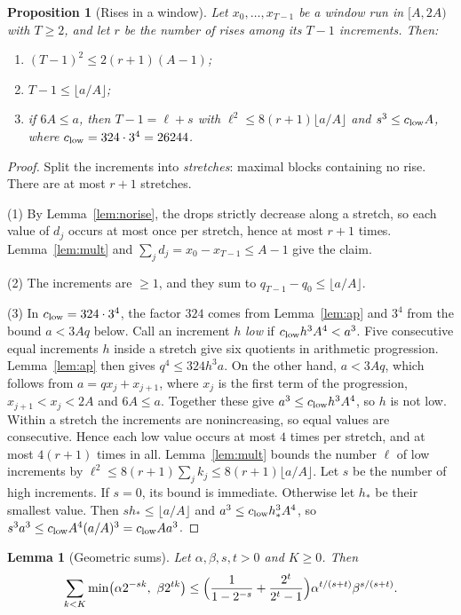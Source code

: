 \documentclass[11pt]{article}
\newtheorem{lemma}[theorem]{Lemma}
\newtheorem{proposition}[theorem]{Proposition}
\theoremstyle{definition}
\theoremstyle{remark}
\begin{document}
\begin{proposition}[Rises in a window]\label{prop:rises}
Let $x_0,\dots,x_{T-1}$ be a window run in $[A,2A)$ with $T\ge2$, and let $r$ be the number
of rises among its $T-1$ increments. Then:
\begin{enumerate}
\item $(T-1)^2\le 2(r+1)(A-1)$;
\item $T-1\le\lfloor a/A\rfloor$;
\item if $6A\le a$, then $T-1=\ell+s$ with $\ell^2\le 8(r+1)\lfloor a/A\rfloor$ and
$s^3\le c_{\rm low}A$, where $c_{\rm low}=324\cdot3^4=26244$.
\end{enumerate}
\end{proposition}

\begin{proof}
Split the increments into \emph{stretches}: maximal blocks containing no rise. There are at most
$r+1$ stretches.

(1) By Lemma~\ref{lem:norise}, the drops strictly decrease along a stretch, so each value of $d_j$
occurs at most once per stretch, hence at most $r+1$ times. Lemma~\ref{lem:mult} and
$\sum_jd_j=x_0-x_{T-1}\le A-1$ give the claim.

(2) The increments are $\ge1$, and they sum to $q_{T-1}-q_0\le\lfloor a/A\rfloor$.

(3) In $c_{\rm low}=324\cdot3^4$, the factor $324$ comes from Lemma~\ref{lem:ap}
and $3^4$ from the bound $a<3Aq$ below. Call an increment $h$ \emph{low} if
$c_{\rm low}h^3A^4<a^3$. Five consecutive equal increments
$h$ inside a stretch give six quotients in arithmetic progression. Lemma~\ref{lem:ap} then
gives $q^4\le324h^3a$. On the other hand, $a<3Aq$, which follows from $a=qx_j+x_{j+1}$, where $x_j$ is the
first term of the progression, $x_{j+1}<x_j<2A$ and $6A\le a$. Together these give $a^3\le c_{\rm low}h^3A^4$, so $h$ is not low.
Within a stretch the increments are nonincreasing, so equal values are consecutive. Hence each
low value occurs at most $4$ times per stretch, and at most $4(r+1)$ times in all.
Lemma~\ref{lem:mult} bounds the number $\ell$ of low increments by
$\ell^2\le8(r+1)\sum_jk_j\le8(r+1)\lfloor a/A\rfloor$. Let $s$ be the number of high
increments. If $s=0$, its bound is immediate. Otherwise let $h_*$ be their
smallest value. Then $sh_*\le\lfloor a/A\rfloor$ and
$a^3\le c_{\rm low}h_*^3A^4$, so $s^3a^3\le c_{\rm low}A^4(a/A)^3=c_{\rm low}Aa^3$.
\end{proof}

\begin{lemma}[Geometric sums]\label{lem:geom}
Let $\alpha,\beta,s,t>0$ and $K\ge0$. Then
\[
\sum_{k<K}\min\bigl(\alpha2^{-sk},\ \beta2^{tk}\bigr)\le
\Bigl(\frac1{1-2^{-s}}+\frac{2^t}{2^t-1}\Bigr)\alpha^{t/(s+t)}\beta^{s/(s+t)} .
\]
\end{lemma}
\end{document}
